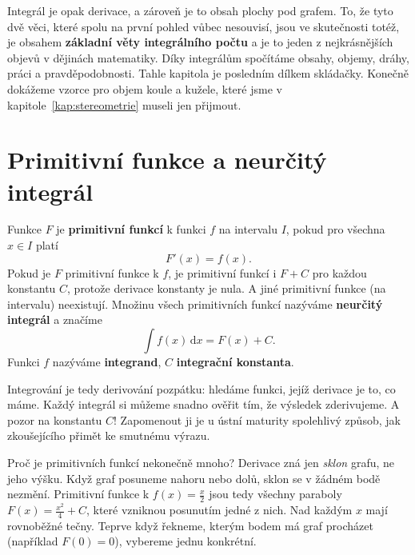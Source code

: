 \label{kap:integraly}

Integrál je opak derivace, a zároveň je to obsah plochy pod grafem. To, že tyto dvě věci, které spolu na první pohled vůbec nesouvisí, jsou ve skutečnosti totéž, je obsahem \textbf{základní věty integrálního počtu} a je to jeden z nejkrásnějších objevů v dějinách matematiky. Díky integrálům spočítáme obsahy, objemy, dráhy, práci a pravděpodobnosti. Tahle kapitola je posledním dílkem skládačky. Konečně dokážeme vzorce pro objem koule a kužele, které jsme v kapitole~\ref{kap:stereometrie} museli jen přijmout.

\section{Primitivní funkce a neurčitý integrál}\label{sec:primitivni-funkce}

\begin{definitionbox}
  Funkce $F$ je \textbf{primitivní funkcí} k funkci $f$ na intervalu $I$, pokud pro všechna $x\in I$ platí
  \begin{equation*}
    F'(x) = f(x).
  \end{equation*}
  Pokud je $F$ primitivní funkce k $f$, je primitivní funkcí i $F + C$ pro každou konstantu $C$, protože derivace konstanty je nula. A jiné primitivní funkce (na intervalu) neexistují. Množinu všech primitivních funkcí nazýváme \textbf{neurčitý integrál} a značíme
  \begin{equation*}
    \int f(x)\,\mathrm{d}x = F(x) + C.
  \end{equation*}
  Funkci $f$ nazýváme \textbf{integrand}, $C$ \textbf{integrační konstanta}.
\end{definitionbox}

Integrování je tedy derivování pozpátku: hledáme funkci, jejíž derivace je to, co máme. Každý integrál si můžeme snadno ověřit tím, že výsledek zderivujeme. A pozor na konstantu $C$! Zapomenout ji je u ústní maturity spolehlivý způsob, jak zkoušejícího přimět ke smutnému výrazu.

Proč je primitivních funkcí nekonečně mnoho? Derivace zná jen \textit{sklon} grafu, ne jeho výšku. Když graf posuneme nahoru nebo dolů, sklon se v žádném bodě nezmění. Primitivní funkce k $f(x) = \frac{x}{2}$ jsou tedy všechny paraboly $F(x) = \frac{x^2}{4} + C$, které vzniknou posunutím jedné z nich. Nad každým $x$ mají rovnoběžné tečny. Teprve když řekneme, kterým bodem má graf procházet (například $F(0) = 0$), vybereme jednu konkrétní.

